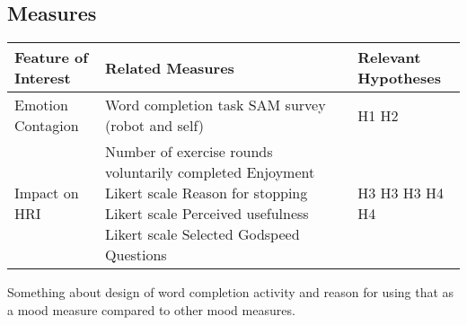 \documentclass[11pt,a4paper]{report}
\begin{document}
\subsection{Measures}
\begin{tabular}{|l|p{7cm}|p{3.8cm}|}
\hline Feature of Interest & Related Measures & Relevant Hypotheses \\ 
\hline Emotion Contagion & Word completion task \newline SAM survey (robot and self) & H1 \newline H2 \\ 
\hline Impact on HRI & Number of exercise rounds voluntarily completed \newline Enjoyment Likert scale \newline Reason for stopping Likert scale \newline Perceived usefulness Likert scale \newline Selected Godspeed Questions &  H3 \newline \newline H3 \newline H3 \newline H4 \newline H4 \\
\hline 
\end{tabular} 
Something about design of word completion activity and reason for using that as a mood measure compared to other mood measures. 
\end{document}
